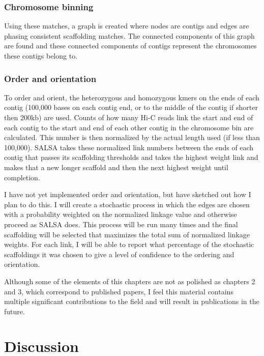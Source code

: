 \subsubsection{Chromosome binning}

\par{
Using these matches, a graph is created where nodes are contigs and edges are phasing consistent scaffolding matches. The connected components of this graph are found and these connected components of contigs represent the chromosomes these contigs belong to. 
}

\subsubsection{Order and orientation}

\par{
To order and orient, the heterozygous and homozygous kmers on the ends of each contig (100,000 bases on each contig end, or to the middle of the contig if shorter then 200kb) are used. Counts of how many Hi-C reads link the start and end of each contig to the start and end of each other contig in the chromosome bin are calculated. This number is then normalized by the actual length used (if less than 100,000). SALSA takes these normalized link numbers between the ends of each contig that passes its scaffolding thresholds and takes the highest weight link and makes that a new longer scaffold and then the next highest weight until completion.
}

\par{I have not yet implemented order and orientation, but have sketched out how I plan to do this. I will create a stochastic process in which the edges are chosen with a probability weighted on the normalized linkage value and otherwise proceed as SALSA does. This process will be run many times and the final scaffolding will be selected that maximizes the total sum of normalized linkage weights. For each link, I will be able to report what percentage of the stochastic scaffoldings it was chosen to give a level of confidence to the ordering and orientation.
}

\par{
Although some of the elements of this chapters are not as polished as chapters 2 and 3, which correspond to published papers, I feel this material contains multiple significant contributions to the field and will result in publications in the future.
}


\section{Discussion}

